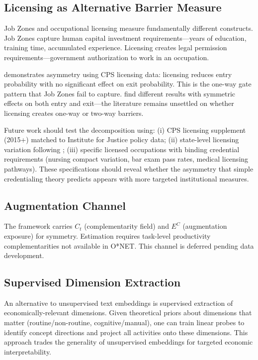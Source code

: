 \documentclass[12pt]{article}
\begin{document}
\subsection{Licensing as Alternative Barrier Measure}
\label{subsec:licensing-extension}


Job Zones and occupational licensing measure fundamentally different constructs. Job Zones capture human capital investment requirements---years of education, training time, accumulated experience. Licensing creates legal permission requirements---government authorization to work in an occupation.

\citet{Jackson2023} demonstrates asymmetry using CPS licensing data: licensing reduces entry probability with no significant effect on exit probability. This is the one-way gate pattern that Job Zones fail to capture. \citet{KleinerXu2020} find different results with symmetric effects on both entry and exit---the literature remains unsettled on whether licensing creates one-way or two-way barriers.

Future work should test the decomposition using: (i) CPS licensing supplement (2015+) matched to Institute for Justice policy data; (ii) state-level licensing variation following \citet{KleinerXu2020}; (iii) specific licensed occupations with binding credential requirements (nursing compact variation, bar exam pass rates, medical licensing pathways). These specifications should reveal whether the asymmetry that simple credentialing theory predicts appears with more targeted institutional measures.


\subsection{Augmentation Channel}
\label{subsec:augmentation}


The framework carries $C_t$ (complementarity field) and $E^C$ (augmentation exposure) for symmetry. Estimation requires task-level productivity complementarities not available in O*NET. This channel is deferred pending data development.


\subsection{Supervised Dimension Extraction}
\label{subsec:supervised}


An alternative to unsupervised text embeddings is supervised extraction of economically-relevant dimensions. Given theoretical priors about dimensions that matter (routine/non-routine, cognitive/manual), one can train linear probes to identify concept directions and project all activities onto these dimensions. This approach trades the generality of unsupervised embeddings for targeted economic interpretability.
\end{document}

